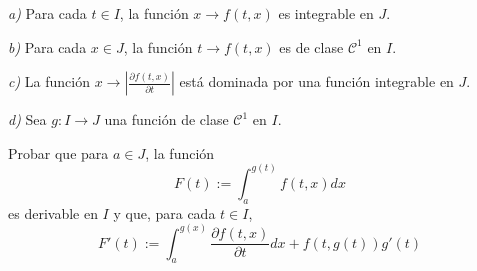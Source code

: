 
\textit{a)} Para cada $t\in I$, la función $x\to f(t,x)$ es integrable en $J$.

\textit{b)} Para cada $x\in J$, la función $t\to f(t,x)$ es de clase $\mathcal{C}^1$ en $I$.

\textit{c)} La función $x\to \left| \frac{\partial f(t,x)}{\partial t}\right|$ está dominada por una función integrable en $J$.

\textit{d)} Sea $g:I\to J$ una función de clase $\mathcal{C}^1$ en $I$.

Probar que para $a\in J$, la función 
\[ F(t) := \int_a^{g(t)} f(t,x)dx \]
es derivable en $I$ y que, para cada $t\in I$,
\[ F'(t) := \int_a^{g(x)} \frac{\partial f(t,x)}{\partial	 t} dx + f(t, g(t)) g'(t)\]
